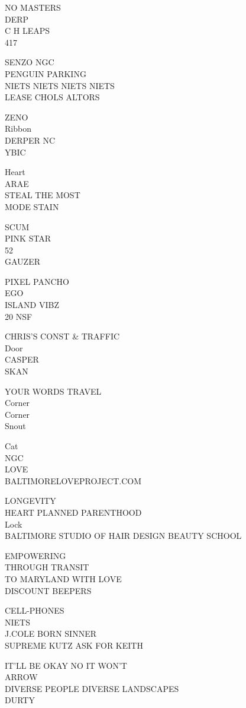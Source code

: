 \documentclass[10pt,letterpaper]{article}
\begin{document}
NO MASTERS\\
DERP\\
C H LEAPS\\
417

SENZO NGC\\
PENGUIN PARKING\\
NIETS NIETS NIETS NIETS\\
LEASE CHOLS ALTORS

ZENO\\
Ribbon\\
DERPER NC\\
YBIC

Heart\\
ARAE\\
STEAL THE MOST\\
MODE STAIN

SCUM\\
PINK STAR\\
52\\
GAUZER

PIXEL PANCHO\\
EGO\\
ISLAND VIBZ\\
20 NSF

CHRIS'S CONST \& TRAFFIC\\
Door\\
CASPER\\
SKAN

YOUR WORDS TRAVEL\\
Corner\\
Corner\\
Snout

Cat\\
NGC\\
LOVE\\
BALTIMORELOVEPROJECT.COM

LONGEVITY\\
HEART PLANNED PARENTHOOD\\
Lock\\
BALTIMORE STUDIO OF HAIR DESIGN BEAUTY SCHOOL

EMPOWERING\\
THROUGH TRANSIT\\
TO MARYLAND WITH LOVE\\
DISCOUNT BEEPERS

CELL{-}PHONES\\
NIETS\\
J.COLE BORN SINNER\\
SUPREME KUTZ ASK FOR KEITH

IT'LL BE OKAY NO IT WON'T\\
ARROW\\
DIVERSE PEOPLE DIVERSE LANDSCAPES\\
DURTY
\end{document}
